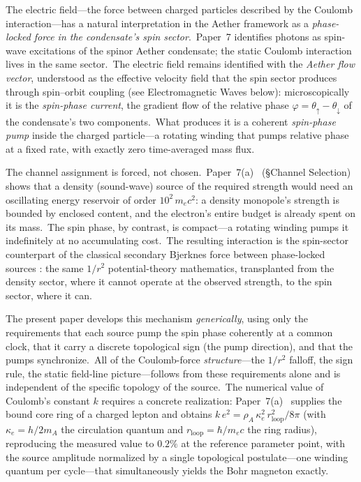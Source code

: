 ﻿\documentclass[12pt,letterpaper]{article}
\newcommand{\rhoa}{\rho_{\!A}}
\begin{document}
The electric field---the force between charged particles described by the Coulomb
interaction---has a natural interpretation in the Aether framework as a
\emph{phase-locked force in the condensate's spin sector}.\ Paper~7
\cite{otto-quantum} identifies photons as spin-wave excitations of the spinor
Aether condensate; the static Coulomb interaction lives in the same sector.\ The
electric field remains identified with the \emph{Aether flow vector}, understood
as the effective velocity field that the spin sector produces through spin--orbit
coupling (see Electromagnetic Waves below): microscopically it is the
\emph{spin-phase current}, the gradient flow of the relative phase
$\varphi = \theta_\uparrow - \theta_\downarrow$ of the condensate's two
components.\ What produces it is a coherent \emph{spin-phase pump} inside the
charged particle---a rotating winding that pumps relative phase at a fixed rate,
with exactly zero time-averaged mass flux.

The channel assignment is forced, not chosen.\
Paper~7(a)~\cite{otto-boundcore} (§Channel Selection) shows that a density
(sound-wave) source of the required strength would need an oscillating energy
reservoir of order $10^{2}\,m_e c^2$: a density monopole's strength is bounded
by enclosed content, and the electron's entire budget is already spent on its
mass.\ The spin phase, by contrast, is compact---a rotating winding pumps it
indefinitely at no accumulating cost.\ The resulting interaction is the
spin-sector counterpart of the classical secondary Bjerknes force between
phase-locked sources \cite{bjerknes1906}: the same $1/r^2$ potential-theory
mathematics, transplanted from the density sector, where it cannot operate at
the observed strength, to the spin sector, where it can.

The present paper develops this mechanism \emph{generically}, using only the
requirements that each source pump the spin phase coherently at a common
clock, that it carry a discrete topological sign (the pump direction), and
that the pumps synchronize.\ All of the Coulomb-force \emph{structure}---the
$1/r^2$ falloff, the sign rule, the static field-line picture---follows from
these requirements alone and is independent of the specific topology of the
source.\ The numerical value of Coulomb's constant $k$ requires a concrete
realization: Paper~7(a)~\cite{otto-boundcore} supplies the bound core ring of
a charged lepton and obtains
$k\,e^2 = \rhoa\,\kappa_e^2\,r_{\mathrm{loop}}^2/8\pi$ (with
$\kappa_e = h/2m_A$ the circulation quantum and
$r_{\mathrm{loop}} = \hbar/m_e c$ the ring radius), reproducing the measured
value to $0.2\%$ at the reference parameter point, with the source amplitude
normalized by a single topological postulate---one winding quantum per
cycle---that simultaneously yields the Bohr magneton exactly.
\end{document}
